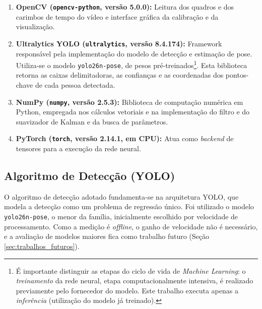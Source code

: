 \documentclass[
    12pt,               %
    openright,          %
    twoside,            %
    a4paper,            %
    chapter=TITLE,      %
    english,            %
    brazil              %
    ]{abntex2}
\begin{document}
\begin{enumerate}
    \item \textbf{OpenCV (\texttt{opencv-python}, versão 5.0.0):} Leitura dos quadros e dos carimbos de tempo do vídeo e interface gráfica da calibração e da visualização.

    \item \textbf{Ultralytics YOLO (\texttt{ultralytics}, versão 8.4.174):} Framework responsável pela implementação do modelo de detecção e estimação de pose. Utiliza-se o modelo \texttt{yolo26n-pose}, de pesos pré-treinados\footnote{É importante distinguir as etapas do ciclo de vida de \textit{Machine Learning}: o \textit{treinamento} da rede neural, etapa computacionalmente intensiva, é realizado previamente pelo fornecedor do modelo. Este trabalho executa apenas a \textit{inferência} (utilização do modelo já treinado).}. Esta biblioteca retorna as caixas delimitadoras, as confianças e as coordenadas dos pontos-chave de cada pessoa detectada.

    \item \textbf{NumPy (\texttt{numpy}, versão 2.5.3):} Biblioteca de computação numérica em Python, empregada nos cálculos vetoriais e na implementação do filtro e do suavizador de Kalman e da busca de parâmetros.

    \item \textbf{PyTorch (\texttt{torch}, versão 2.14.1, em CPU):} Atua como \textit{backend} de tensores para a execução da rede neural.
\end{enumerate}

\subsection{Algoritmo de Detecção (YOLO)}

O algoritmo de detecção adotado fundamenta-se na arquitetura YOLO, que modela a detecção como um problema de regressão único. Foi utilizado o modelo \texttt{yolo26n-pose}, o menor da família, inicialmente escolhido por velocidade de processamento. Como a medição é \textit{offline}, o ganho de velocidade não é necessário, e a avaliação de modelos maiores fica como trabalho futuro (Seção \ref{sec:trabalhos_futuros}).
\end{document}
